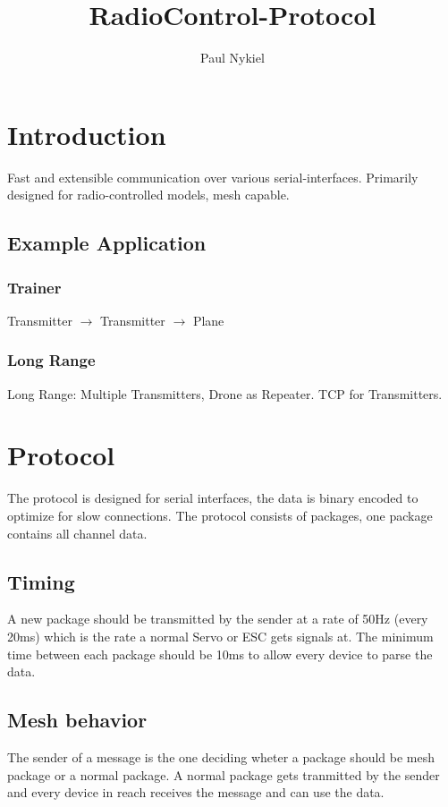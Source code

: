 \documentclass{report}
\title{RadioControl-Protocol}
\author{Paul Nykiel}
\begin{document}
\maketitle
\tableofcontents

\pagebreak

\chapter{Introduction}
  Fast and extensible communication over various serial-interfaces. Primarily
  designed for radio-controlled models, mesh capable.

\section{Example Application}
\subsection{Trainer}
Transmitter $\to$ Transmitter $\to$ Plane
\subsection{Long Range}
  Long Range: Multiple Transmitters, Drone as Repeater. TCP for Transmitters.

\chapter{Protocol}
  The protocol is designed for serial interfaces, the data is binary encoded to
  optimize for slow connections. The protocol consists of packages, one package
  contains all channel data.

  \section{Timing}
    A new package should be transmitted by the sender at a rate of 50Hz (every
    20ms) which is the rate a normal Servo or ESC gets signals at. The minimum
    time between each package should be 10ms to allow every device to parse the
    data.

  \section{Mesh behavior}
    The sender of a message is the one deciding wheter a package should be mesh
    package or a normal package. A normal package gets tranmitted by the sender
    and every device in reach receives the message and can use the data.
\end{document}
